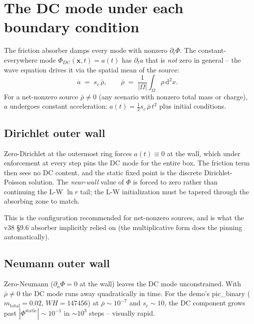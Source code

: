 \documentclass[11pt,a4paper]{article}
\newcommand{\vv}[1]{\mathbf{#1}}
\newcommand{\dd}{\mathrm{d}}
\newcommand{\half}{\tfrac{1}{2}}
\begin{document}
\section{The DC mode under each boundary condition}
\label{sec:dc_mode}

The friction absorber damps every mode with nonzero
$\partial_t \Phi$.  The constant-everywhere mode $\Phi_{DC}(\vv{x},t) =
a(t)$ has $\partial_t a$ that is \emph{not} zero in general -- the
wave equation drives it via the spatial mean of the source:
\begin{equation}
  \ddot a \;=\; s_c\,\bar\rho,
  \qquad
  \bar\rho \;=\; \frac{1}{|\Omega|}\int_\Omega \rho\,\dd^2 x.
\end{equation}
For a net-nonzero source $\bar\rho \ne 0$ (any scenario with nonzero
total mass or charge), $a$ undergoes constant acceleration:
$a(t) = \half s_c\,\bar\rho\,t^2$ plus initial conditions.

\subsection{Dirichlet outer wall}

Zero-Dirichlet at the outermost ring forces $a(t) \equiv 0$ at the
wall, which under enforcement at every step pins the DC mode for the
entire box.  The friction term then sees no DC content, and the
static fixed point is the discrete Dirichlet-Poisson solution.  The
\emph{near-wall} value of $\Phi$ is forced to zero rather than
continuing the L-W $\ln r$ tail; the L-W initialization must be
tapered through the absorbing zone to match.

This is the configuration recommended for net-nonzero sources, and
is what the v38 \S 9.6 absorber implicitly relied on (the
multiplicative form does the pinning automatically).

\subsection{Neumann outer wall}

Zero-Neumann ($\partial_n \Phi = 0$ at the wall) leaves the DC mode
unconstrained.  With $\bar\rho \ne 0$ the DC mode runs away
quadratically in time.  For the demo's pic\_binary
($m_\text{total} = 0.02$, $W H = 147456$) at $\bar\rho \sim
10^{-7}$ and $s_c \sim 10$, the DC component grows past $|\Phi^\text{static}|
\sim 10^{-1}$ in $\sim 10^3$ steps -- visually rapid.
\end{document}

